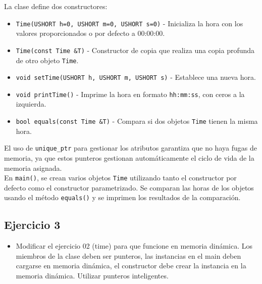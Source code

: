 \documentclass{article}
\begin{document}
        La clase define dos constructores:
        \begin{itemize}
            \item \texttt{Time(USHORT h=0, USHORT m=0, USHORT s=0)} - Inicializa la hora con los valores proporcionados o por defecto a 00:00:00.
            \item \texttt{Time(const Time \&T)} - Constructor de copia que realiza una copia profunda de otro objeto \texttt{Time}.
        \end{itemize}
        
        \begin{itemize}
            \item \texttt{void setTime(USHORT h, USHORT m, USHORT s)} - Establece una nueva hora.
            \item \texttt{void printTime()} - Imprime la hora en formato \texttt{hh:mm:ss}, con ceros a la izquierda.
            \item \texttt{bool equals(const Time \&T)} - Compara si dos objetos \texttt{Time} tienen la misma hora.
        \end{itemize}
        
        El uso de \texttt{unique\_ptr} para gestionar los atributos garantiza que no haya fugas de memoria, ya que estos punteros gestionan automáticamente el ciclo de vida de la memoria asignada. \\
        
        En \texttt{main()}, se crean varios objetos \texttt{Time} utilizando tanto el constructor por defecto como el constructor parametrizado. Se comparan las horas de los objetos usando el método \texttt{equals()} y se imprimen los resultados de la comparación.\\
        
        
        \subsection{Ejercicio 3}
        \begin{itemize}
            \item Modificar el ejercicio 02 (time) para que funcione en memoria dinámica. Los miembros de la clase deben ser punteros, las instancias en el main deben cargarse en memoria dinámica, el constructor debe crear la instancia en la memoria dinámica. Utilizar punteros inteligentes.
        \end{itemize}  
        
        
        
\end{document}
